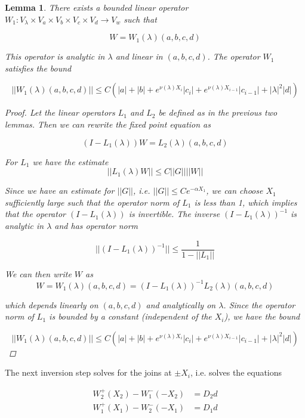 \documentclass[12pt]{article}
\newtheorem{lemma}{Lemma}
\begin{document}
\begin{lemma}\label{W1}
There exists a bounded linear operator $W_1: V_\lambda \times V_a \times V_b \times V_c \times V_d \rightarrow V_w$ such that 

\[
W = W_1(\lambda)(a,b,c,d)
\]

This operator is analytic in $\lambda$ and linear in $(a, b, c, d)$. The operator $W_1$ satisfies the bound

\begin{equation}\label{W1bound}
||W_1(\lambda)(a,b,c,d)|| \leq C (|a| + |b| + e^{\nu(\lambda)X_i}|c_i| + e^{\nu(\lambda)X_{i-1}}|c_{i-1}| + |\lambda|^2 |d| )
\end{equation}

\begin{proof}
Let the linear operators $L_1$ and $L_2$ be defined as in the previous two lemmas. Then we can rewrite the fixed point equation as

\[
(I - L_1(\lambda))W = L_2(\lambda)(a,b,c,d)
\]

For $L_1$ we have the estimate
\[
||L_1(\lambda)W|| \leq C ||G|| ||W||
\]

Since we have an estimate for $||G||$, i.e. $||G|| \leq C e^{-\alpha X_1}$, we can choose $X_1$ sufficiently large such that the operator norm of $L_1$ is less than 1, which implies that the operator $(I - L_1(\lambda))$ is invertible. The inverse $(I - L_1(\lambda))^{-1}$ is analytic in $\lambda$ and has operator norm 

\[
||(I - L_1(\lambda))^{-1}|| \leq \frac{1}{1 - ||L_1||}
\]

We can then write $W$ as
\[
W = W_1(\lambda)(a,b,c,d) = (I - L_1(\lambda))^{-1} L_2(\lambda)(a,b,c,d)
\]

which depends linearly on $(a,b,c,d)$ and analytically on $\lambda$. Since the operator norm of $L_1$ is bounded by a constant (independent of the $X_i$), we have the bound

\[
||W_1(\lambda)(a,b,c,d)|| \leq C (|a| + |b| + e^{\nu(\lambda)X_i}|c_i| + e^{\nu(\lambda)X_{i-1}}|c_{i-1}| + |\lambda|^2 |d| )
\]

\end{proof}
\end{lemma}

The next inversion step solves for the joins at $\pm X_i$, i.e. solves the equations

\begin{align*}
W_2^+(X_2) - W_1^-(-X_2) &= D_2 d \\
W_1^+(X_1) - W_2^-(-X_1) &= D_1 d \\
\end{align*}
\end{document}

